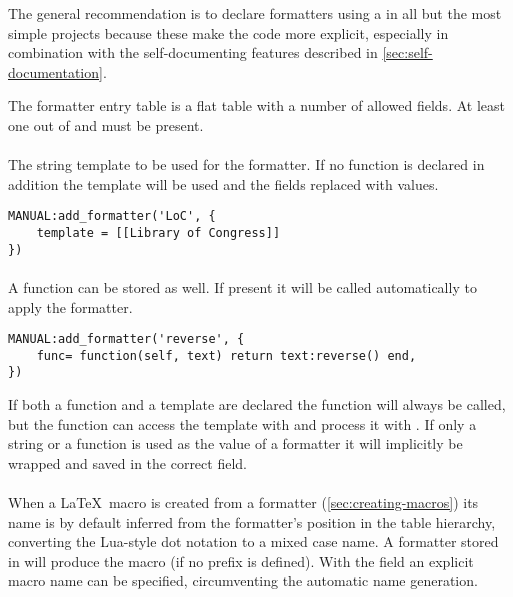 \documentclass[12pt]{scrartcl}
\begin{document}
The general recommendation is to declare formatters using a  in all but the most simple projects because these make the code
more explicit, especially in combination with the self-documenting features
described in \vref{sec:self-documentation}.

The formatter entry table is a flat table with a number of allowed fields.  At
least one out of  and  must be present.

\paragraph{}

The string template to be used for the formatter.  If no function is declared in
addition the template will be used and the fields replaced with values.

\begin{verbatim}
MANUAL:add_formatter('LoC', {
	template = [[Library of Congress]]
})
\end{verbatim}


\paragraph{}

A function can be stored as well.  If present it will be called automatically to
apply the formatter.

\begin{verbatim}
MANUAL:add_formatter('reverse', {
	func= function(self, text) return text:reverse() end,
})
\end{verbatim}

\noindent If both a function and a template are declared the function will
always be called, but the function can access the template with
 and process it with .  If only a
string or a function is used as the value of a formatter it will implicitly be
wrapped and saved in the correct field.


\paragraph{}

When a \LaTeX\ macro is created from a formatter (\vref{sec:creating-macros}) its name is by default inferred from the
formatter's position in the table hierarchy, converting the Lua-style dot
notation to a mixed case name.  A formatter stored in 
will produce the macro  (if no prefix is defined).  With the
 field an explicit macro name can be specified, circumventing the
automatic name generation.
\end{document}
